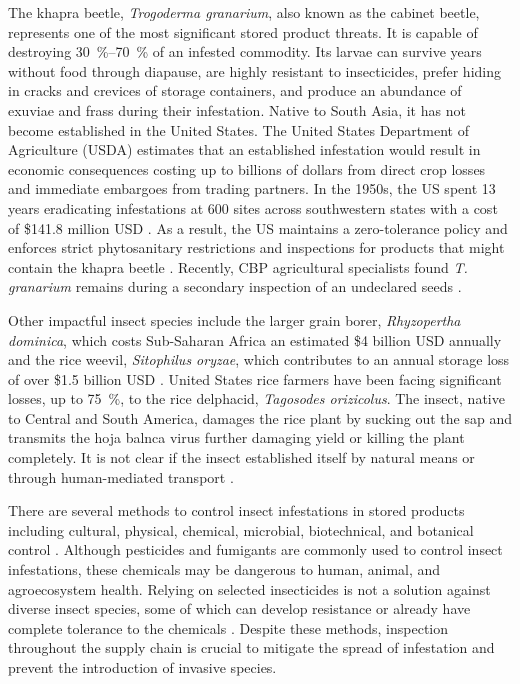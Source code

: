 \documentclass[../Vibro-Acoustic Signatures and Detection Algorithms for Stored Product Insects.tex]{subfiles}
\begin{document}
The khapra beetle, \textit{Trogoderma granarium}, also known as the cabinet beetle, represents one of the most significant stored product threats. It is capable of destroying \SIrange{30}{70}{\percent} of an infested commodity. Its larvae can survive years without food through diapause, are highly resistant to insecticides, prefer hiding in cracks and crevices of storage containers, and produce an abundance of exuviae and frass during their infestation. Native to South Asia, it has not become established in the United States. The United States Department of Agriculture (USDA) estimates that an established infestation would result in economic consequences costing up to billions of dollars from direct crop losses and immediate embargoes from trading partners. In the 1950s, the US spent 13 years eradicating infestations at 600 sites across southwestern states with a cost of \$141.8 million USD \cite{harmanIncreasingGlobalRisk2025}. As a result, the US maintains a zero-tolerance policy and enforces strict phytosanitary restrictions and inspections for products that might contain the khapra beetle \cite{u.s.departmentofagricultureanimalandplanthealthinspectionserviceKhapraBeetleProgram2022}. Recently, CBP agricultural specialists found \textit{T. granarium} remains during a secondary inspection of an undeclared seeds \cite{RemainsWorldsMost2026}.

Other impactful insect species include the larger grain borer, \textit{Rhyzopertha dominica}, which costs Sub-Saharan Africa an estimated \$4 billion USD annually \cite{zoryaMissingFoodCase2011} and the rice weevil, \textit{Sitophilus oryzae}, which contributes to an annual storage loss of over \$1.5 billion USD \cite{banerjiReviewArticleBiology2025, chekolInfluenceRiceVariety2025}. United States rice farmers have been facing significant losses, up to \SI{75}{\percent}, to the rice delphacid, \textit{Tagosodes orizicolus}. The insect, native to Central and South America, damages the rice plant by sucking out the sap and transmits the hoja balnca virus further damaging yield or killing the plant completely. It is not clear if the insect established itself by natural means or through human-mediated transport \cite{marksTinyPestsAre}.

There are several methods to control insect infestations in stored products including cultural, physical, chemical, microbial, biotechnical, and botanical control \cite{katooCallosobruchusMaculatusBiotic2025}. Although pesticides and fumigants are commonly used to control insect infestations, these chemicals may be dangerous to human, animal, and agroecosystem health. Relying on selected insecticides is not a solution against diverse insect species, some of which can develop resistance or already have complete tolerance to the chemicals \cite{akbarEvaluationInsecticidalPotentials2022,akbarEvaluatingEfficacyPlant2024}. Despite these methods, inspection throughout the supply chain is crucial to mitigate the spread of infestation and prevent the introduction of invasive species.
\end{document}
